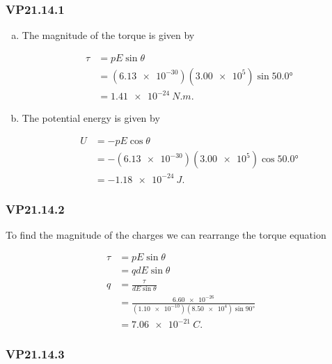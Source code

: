 \documentclass{article}
\begin{document}
\subsubsection{VP21.14.1}

\begin{enumerate}[a)]
  \item The magnitude of the torque is given by

        \begin{align*}
          \tau & = p E \sin \theta                                 \\
               & = (\num{6.13e-30}) (\num{3.00e5}) \sin \ang{50.0} \\
               & = \qty{1.41e-24}{N.m}.
        \end{align*}

  \item The potential energy is given by

        \begin{align*}
          U & = -p E \cos \theta                                 \\
            & = -(\num{6.13e-30}) (\num{3.00e5}) \cos \ang{50.0} \\
            & = \qty{-1.18e-24}{J}.
        \end{align*}
\end{enumerate}

\subsubsection{VP21.14.2}

To find the magnitude of the charges we can rearrange the torque equation

\begin{align*}
  \tau & = p E \sin \theta                                                      \\
       & = q d E \sin \theta                                                    \\
  q    & = \frac{\tau}{d E \sin \theta}                                         \\
       & = \frac{\num{6.60e-26}}{(\num{1.10e-10}) (\num{8.50e4}) \sin \ang{90}} \\
       & = \qty{7.06e-21}{C}.
\end{align*}

\subsubsection{VP21.14.3}
\end{document}
